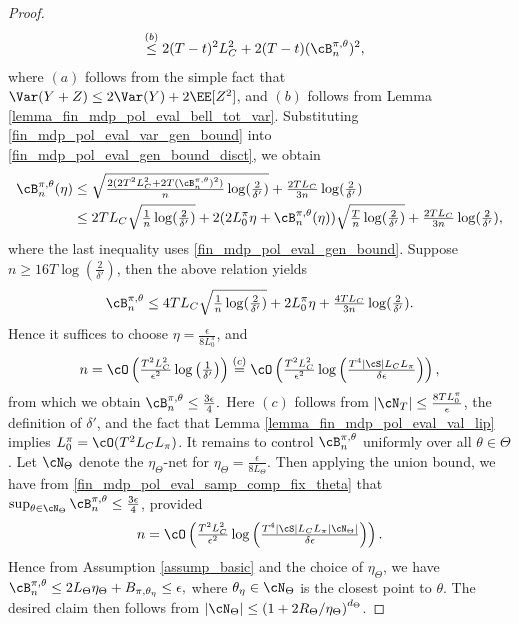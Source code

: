 \documentclass[9pt]{article}
\numberwithin{equation}{section}
\renewcommand{\frac}[2]{\tfrac{#1}{#2}}
\begin{document}
\begin{proof}
\begin{align}
        & \overset{(b)}{\leq} 2(T-t)^2 L_C^2 + 2(T-t)(\cB^{\pi,\theta}_n)^2, \label{fin_mdp_pol_eval_var_gen_bound}
    \end{align}
    where $(a)$ follows from the simple fact that  $\Var(Y + Z) \leq 2\Var(Y) + 2\EE[Z^2]$, and $(b)$ follows from Lemma \ref{lemma_fin_mdp_pol_eval_bell_tot_var}.
    Substituting \eqref{fin_mdp_pol_eval_var_gen_bound} into \eqref{fin_mdp_pol_eval_gen_bound_disct}, we obtain
    \begin{align*}
        \cB^{\pi,\theta}_n(\eta) & \leq \sqrt{\tfrac{2(2T^2 L_C^2 + 2T(\cB^{\pi,\theta}_n)^2)}{n}\log(\tfrac{2}{\delta'})} + \tfrac{2 T L_C}{3n} \log(\tfrac{2}{\delta'}) \\
        & \leq 2 T L_C \sqrt{\tfrac{1}{n} \log (\tfrac{2}{\delta'})} + 2 (2L_0^\pi \eta + \cB^{\pi,\theta}_n(\eta)) \sqrt{\tfrac{T}{n} \log (\tfrac{2}{\delta'})} + \tfrac{2T L_C}{3n}  \log(\tfrac{2}{\delta'}),
    \end{align*}
    where the last inequality uses \eqref{fin_mdp_pol_eval_gen_bound}. Suppose $n \geq 16T \log(\tfrac{2}{\delta'})$, then the above relation yields
    \begin{align}
    \cB^{\pi,\theta}_n \leq 4 T L_C \sqrt{\tfrac{1}{n} \log (\tfrac{2}{\delta'})} + 2L_0^\pi \eta + \tfrac{4T L_C}{3n}  \log(\tfrac{2}{\delta'}). \nonumber
    \end{align}
    Hence  it suffices to choose $\eta = \tfrac{\epsilon}{8 L_0^\pi}$, and
    \begin{align}
        n = \cO \left( \tfrac{T^2 L_C^2}{\epsilon^2} \log \left(\tfrac{1}{\delta'} \right)\right) \overset{(c)}{=} \cO \left( \tfrac{T^2 L_C^2}{\epsilon^2} \log \left(\tfrac{T^4 |\cS| L_C L_\pi}{\delta \epsilon} \right)\right) \label{fin_mdp_pol_eval_samp_comp_fix_theta}, 
    \end{align}
    from which we obtain 
    $
        \cB^{\pi,\theta}_n \leq \tfrac{3\epsilon}{4}.
    $
    Here $(c)$ follows from $|\cN_T| \leq \tfrac{ 8T L_0^\pi}{\epsilon}$, the definition of $\delta'$, and the fact that  Lemma \ref{lemma_fin_mdp_pol_eval_val_lip} implies $L_0^\pi = \cO(T^2 L_C L_\pi)$.
    It remains to control $\cB^{\pi,\theta}_n$ uniformly over all $\theta \in \Theta$.
    Let $\cN_\Theta$ denote the $\eta_\Theta$-net for $\eta_\Theta = \frac{\epsilon}{8L_\Theta}$. 
    Then applying the union bound, we have from \eqref{fin_mdp_pol_eval_samp_comp_fix_theta} that 
    $\sup_{\theta \in \cN_\Theta} \cB^{\pi,\theta}_n \leq \frac{3\epsilon}{4}$, provided  
    \begin{align*}
    n = \cO \left( \tfrac{T^2 L_C^2}{\epsilon^2} \log \left(\tfrac{T^4 |\cS| L_C L_\pi |\cN_\Theta|}{\delta \epsilon} \right)\right).
    \end{align*}
    Hence from Assumption \ref{assump_basic} and the choice of $\eta_\Theta$, we have
    $
        \cB^{\pi,\theta}_n \leq 2L_\Theta \eta_\Theta + B_{\pi, \theta_\eta} \leq \epsilon,
    $
    where $\theta_\eta \in \cN_\Theta$ is the closest point to $\theta$.
    The desired claim then follows from $|\cN_\Theta | \leq \left(1 +  {2 R_\Theta}/{\eta_\Theta}\right)^{d_\Theta}$.
\end{proof}
%
\end{document}

